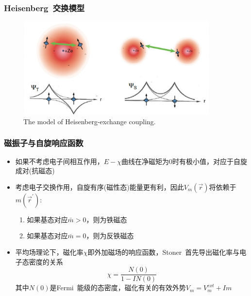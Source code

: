 \frame
{
	\frametitle{\textrm{Heisenberg~}交换模型}
\begin{figure}[h!]
\centering
\includegraphics[height=2.0in,width=4.0in,viewport=0 0 580 290,clip]{Figures/Heisenberg_model.jpg}
\caption{\tiny \textrm{The model of Heisenberg-exchange coupling.}}%
\label{Heisenberg_Model}
\end{figure} 
}

\frame
{
	\frametitle{磁振子与自旋响应函数}
	\begin{itemize}
		\item 如果不考虑电子间相互作用，$E-\chi$曲线在净磁矩为0时有极小值，对应于自旋成对(抗磁态)
		\item 考虑电子交换作用，自旋有序(磁性态)能量更有利，因此$V_m(\vec r)$将依赖于$m(\vec r^{\prime})$:\\
			\begin{enumerate}
				\item 如果基态对应$\bar m>0$，则为铁磁态
				\item 如果基态对应$\bar m=0$，则为反铁磁态
			\end{enumerate}
		\item 平均场理论下，磁化率$\chi$即外加磁场的响应函数，\textrm{Stoner~}首先导出磁化率与电子态密度的关系
			\begin{displaymath}
				\chi=\frac{N(0)}{1-IN(0)}
			\end{displaymath}
			其中$N(0)$是\textrm{Fermi~}能级的态密度，磁化有关的有效外势$V_m=V_m^{ext}+Im$
	\end{itemize}
}

